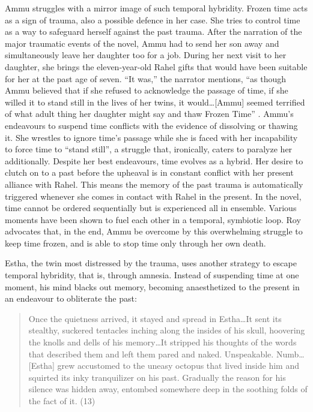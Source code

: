 Ammu struggles with a mirror image of such temporal hybridity. Frozen time acts as a sign of trauma, also a possible defence in her case. She tries to control time as a way to safeguard herself against the past trauma. After the narration of the major traumatic events of the novel, Ammu had to send her son away and simultaneously leave her daughter too for a job. During her next visit to her daughter, she brings the eleven-year-old Rahel gifts that would have been suitable for her at the past age of seven. ``It was,'' the narrator mentions, ``as though Ammu believed that if she refused to acknowledge the passage of time, if she willed it to stand still in the lives of her twins, it would\ldots [Ammu] seemed terrified of what adult thing her daughter might say and thaw Frozen Time'' \parencite[152-153]{Roy1997}. Ammu's endeavours to suspend time conflicts with the evidence of dissolving or thawing it. She wrestles to ignore time's passage while she is faced with her incapability to force time to ``stand still'', a struggle that, ironically, caters to paralyze her additionally. Despite her best endeavours, time evolves as a hybrid. Her desire to clutch on to a past before the upheaval is in constant conflict with her present alliance with Rahel. This means the memory of the past trauma is automatically triggered whenever she comes in contact with Rahel in the present. In the novel, time cannot be ordered sequentially but is experienced all in ensemble. Various moments have been shown to fuel each other in a temporal, symbiotic loop. Roy advocates that, in the end, Ammu be overcome by this overwhelming struggle to keep time frozen, and is able to stop time only through her own death.

Estha, the twin most distressed by the trauma, uses another strategy to escape temporal hybridity, that is, through amnesia. Instead of suspending time at one moment, his mind blacks out memory, becoming anaesthetized to the present in an endeavour to obliterate the past: 

\begin{quote}
  Once the quietness arrived, it stayed and spread in Estha\ldots It sent its stealthy, suckered tentacles inching along the insides of his skull, hoovering the knolls and dells of his memory\ldots It stripped his thoughts of the words that described them and left them pared and naked. Unspeakable. Numb\ldots[Estha] grew accustomed to the uneasy octopus that lived inside him and squirted its inky tranquilizer on his past. Gradually the reason for his silence was hidden away, entombed somewhere deep in the soothing folds of the fact of it. (13)
\end{quote}


